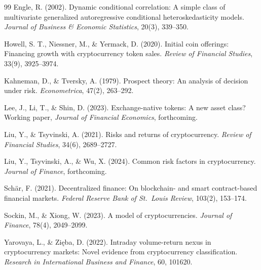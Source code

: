 \documentclass[11pt,a4paper]{article}
\begin{document}
\begin{thebibliography}{99}
 Engle, R. (2002). Dynamic conditional correlation: A simple class of multivariate generalized autoregressive conditional heteroskedasticity models. \emph{Journal of Business \& Economic Statistics}, 20(3), 339--350.

 Howell, S. T., Niessner, M., \& Yermack, D. (2020). Initial coin offerings: Financing growth with cryptocurrency token sales. \emph{Review of Financial Studies}, 33(9), 3925--3974.

 Kahneman, D., \& Tversky, A. (1979). Prospect theory: An analysis of decision under risk. \emph{Econometrica}, 47(2), 263--292.

 Lee, J., Li, T., \& Shin, D. (2023). Exchange-native tokens: A new asset class? Working paper, \emph{Journal of Financial Economics}, forthcoming.

 Liu, Y., \& Tsyvinski, A. (2021). Risks and returns of cryptocurrency. \emph{Review of Financial Studies}, 34(6), 2689--2727.

 Liu, Y., Tsyvinski, A., \& Wu, X. (2024). Common risk factors in cryptocurrency. \emph{Journal of Finance}, forthcoming.

 Schär, F. (2021). Decentralized finance: On blockchain- and smart contract-based financial markets. \emph{Federal Reserve Bank of St.\ Louis Review}, 103(2), 153--174.

 Sockin, M., \& Xiong, W. (2023). A model of cryptocurrencies. \emph{Journal of Finance}, 78(4), 2049--2099.

 Yarovaya, L., \& Zięba, D. (2022). Intraday volume-return nexus in cryptocurrency markets: Novel evidence from cryptocurrency classification. \emph{Research in International Business and Finance}, 60, 101620.

\end{thebibliography}
\end{document}
